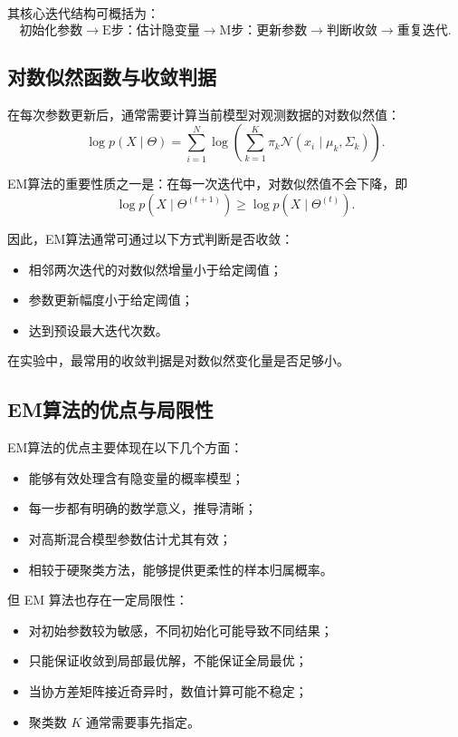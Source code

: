 \documentclass[12pt,a4paper]{ctexart}
\begin{document}
其核心迭代结构可概括为：
\[
\text{初始化参数}
\rightarrow
\text{E步：估计隐变量}
\rightarrow
\text{M步：更新参数}
\rightarrow
\text{判断收敛}
\rightarrow
\text{重复迭代}.
\]

\subsection*{对数似然函数与收敛判据}

在每次参数更新后，通常需要计算当前模型对观测数据的对数似然值：
\[
\log p(X\mid \Theta)=
\sum_{i=1}^{N}\log\left(
\sum_{k=1}^{K}\pi_k \mathcal{N}(x_i\mid \mu_k,\Sigma_k)
\right).
\]

EM算法的重要性质之一是：在每一次迭代中，对数似然值不会下降，即
\[
\log p(X\mid \Theta^{(t+1)}) \ge
\log p(X\mid \Theta^{(t)}).
\]

因此，EM算法通常可通过以下方式判断是否收敛：

\begin{itemize}
	\item 相邻两次迭代的对数似然增量小于给定阈值；
	\item 参数更新幅度小于给定阈值；
	\item 达到预设最大迭代次数。
\end{itemize}

在实验中，最常用的收敛判据是对数似然变化量是否足够小。

\subsection*{EM算法的优点与局限性}

EM算法的优点主要体现在以下几个方面：

\begin{itemize}
	\item 能够有效处理含有隐变量的概率模型；
	\item 每一步都有明确的数学意义，推导清晰；
	\item 对高斯混合模型参数估计尤其有效；
	\item 相较于硬聚类方法，能够提供更柔性的样本归属概率。
\end{itemize}

但 EM 算法也存在一定局限性：

\begin{itemize}
	\item 对初始参数较为敏感，不同初始化可能导致不同结果；
	\item 只能保证收敛到局部最优解，不能保证全局最优；
	\item 当协方差矩阵接近奇异时，数值计算可能不稳定；
	\item 聚类数 $K$ 通常需要事先指定。
\end{itemize}
\end{document}
